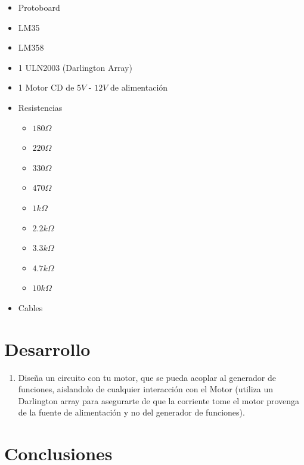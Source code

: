 	\begin{itemize}
		\item Protoboard
		\item LM35
		\item LM358
		\item 1 ULN2003 (Darlington Array)
		\item 1 Motor CD de $5 V$ - $12 V$ de alimentación
		\item Resistencias
		\begin{itemize}
			\item $180 \Omega$
			\item $220 \Omega$
			\item $330 \Omega$
			\item $470 \Omega$
			\item $1 k\Omega$
			\item $2.2 k\Omega$
			\item $3.3 k\Omega$
			\item $4.7 k\Omega$
			\item $10 k\Omega$
		\end{itemize}
		\item Cables
	\end{itemize}


\section{Desarrollo}

	\begin{enumerate}
		\item Diseña un circuito con tu motor, que se pueda acoplar al generador de funciones, aislandolo de cualquier interacción con el Motor (utiliza un Darlington array para asegurarte de que la corriente tome el motor provenga de la fuente de alimentación y no del generador de funciones).
	\end{enumerate}



\section{Conclusiones}

